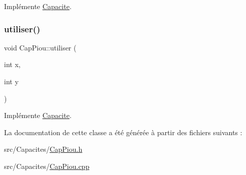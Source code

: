 Implémente \hyperlink{class_capacite_a7d4e86c20cd198960f25c0eb443148fe}{Capacite}.

\mbox{\label{class_cap_piou_a20ed7a993ce209a3df246f655f107f22}} 
\subsubsection{\texorpdfstring{utiliser()}{utiliser()}}
{\footnotesize\ttfamily void Cap\+Piou\+::utiliser (\begin{DoxyParamCaption}\item[{int}]{x,  }\item[{int}]{y }\end{DoxyParamCaption})\hspace{0.3cm}{\ttfamily [virtual]}}



Implémente \hyperlink{class_capacite_a4d4f643987fcc2168567bf28a36ea418}{Capacite}.



La documentation de cette classe a été générée à partir des fichiers suivants \+:\begin{DoxyCompactItemize}
\item 
src/\+Capacites/\hyperlink{_cap_piou_8h}{Cap\+Piou.\+h}\item 
src/\+Capacites/\hyperlink{_cap_piou_8cpp}{Cap\+Piou.\+cpp}\end{DoxyCompactItemize}

